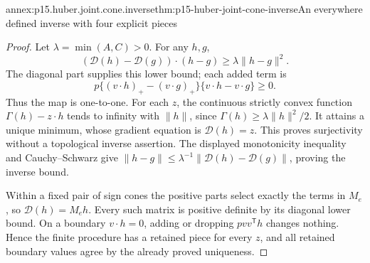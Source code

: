 \begin{annexitem}{annex:p15.huber.joint.cone.inverse}{thm:p15-huber-joint-cone-inverse}{An everywhere defined inverse with four explicit pieces}
\begin{proof}
Let \(\lambda=\min(A,C)>0\). For any \(h,g\),
\[
 (\mathcal D(h)-\mathcal D(g))\cdot(h-g)
 \geq\lambda\|h-g\|^2.
\]
The diagonal part supplies this lower bound; each added term is
\[
 p\{(v\cdot h)_+-(v\cdot g)_+\}\{v\cdot h-v\cdot g\}\geq0.
\]
Thus the map is one-to-one. For each \(z\), the continuous
strictly convex function \(\Gamma(h)-z\cdot h\) tends to infinity
with \(\|h\|\), since \(\Gamma(h)\geq\lambda\|h\|^2/2\).
It attains a unique minimum, whose gradient equation is
\(\mathcal D(h)=z\). This proves surjectivity without a
topological inverse assertion.
The displayed monotonicity inequality and Cauchy--Schwarz give
\(\|h-g\|\leq\lambda^{-1}\|\mathcal D(h)-\mathcal D(g)\|\),
proving the inverse bound.

Within a fixed pair of sign cones the positive parts select
exactly the terms in \(M_e\), so \(\mathcal D(h)=M_eh\).
Every such matrix is positive definite by its diagonal lower
bound. On a boundary \(v\cdot h=0\), adding or dropping
\(pvv^{\mathsf T}h\) changes nothing. Hence the finite procedure
has a retained piece for every \(z\), and all retained boundary
values agree by the already proved uniqueness.
\end{proof}
\end{annexitem}

